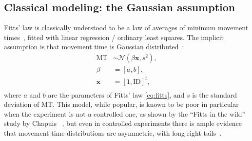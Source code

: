 \documentclass[12pt,a4paper]{article}
\begin{document}
\subsection{Classical modeling: the Gaussian assumption}
Fitts' law is classically understood to be a law of averages of minimum movement times~\cite{gori2017two}, fitted with linear regression / ordinary least squares. The implicit assumption is that movement time is Gaussian distributed~\cite{soukoreff2004}:
\begin{align}
	\text{MT}  & \sim \mathcal{N}(\beta \mathbf{x}, s^2),\label{eq:gaussian_model} \\
	\beta      & = [a,b],                                                          \\
	\mathbf{x} & = [1, \text{ID}]^t,                                               \\
\end{align}
where $a$ and $b$ are the parameters of Fitts' law \autoref{eq:fitts}, and $s$ is the standard deviation of MT.
This model, while popular, is known to be poor in particular when the experiment is not a controlled one, as shown by the ``Fitts in the wild'' study by Chapuis\etal{} ~\cite{chapuis2007}, but even in controlled experiments there is ample evidence that movement time distributions are asymmetric, with long right tails~\cite{gori2018these,jude2016,nieuwenhuizen2016}.


\end{document}
